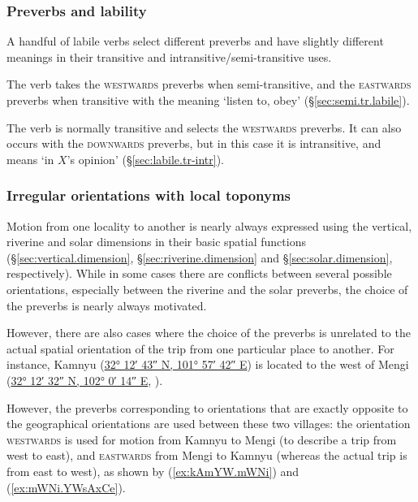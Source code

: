 \subsubsection{Preverbs and lability} \label{sec:orientation.lability}
A handful of labile verbs select different preverbs and have slightly different meanings in their transitive and intransitive/semi-transitive uses.

The verb  takes the \textsc{westwards} preverbs when semi-transitive, and the \textsc{eastwards} preverbs when transitive with the meaning `listen to, obey' (§\ref{sec:semi.tr.labile}).  

The verb  is normally transitive and selects the \textsc{westwards} preverbs. It can also occurs with the \textsc{downwards} preverbs, but in this case it is intransitive, and means `in $X$'s opinion' (§\ref{sec:labile.tr-intr}). 

\subsubsection{Irregular orientations with local toponyms} \label{sec:local.toponyms.orientation}
Motion from one locality to another is nearly always expressed using the vertical, riverine and solar dimensions in their basic spatial functions (§\ref{sec:vertical.dimension}, §\ref{sec:riverine.dimension} and §\ref{sec:solar.dimension}, respectively). While in some cases there are conflicts between several possible orientations, especially between the riverine and the solar preverbs, the choice of the preverbs is nearly always motivated.

However, there are also cases where the choice of the preverbs is unrelated to the actual spatial orientation of the trip from one particular place to another. For instance, Kamnyu  (\href{https://geohack.toolforge.org/geohack.php?params=32.21181437468092_N_101.96170811415986_E}{32° 12′ 43″ N, 101° 57′ 42″ E}) is located to the west of Mengi  (\href{https://geohack.toolforge.org/geohack.php?params=32.20892642316477_N_102.00383911415355_E}{32° 12′ 32″ N, 102° 0′ 14″ E}, ). 

However, the preverbs corresponding to orientations that are exactly opposite to the geographical orientations are used between these two villages: the orientation \textsc{westwards} is used for motion from Kamnyu to Mengi (to describe a trip from west to east), and \textsc{eastwards} from Mengi to Kamnyu (whereas the actual trip is from east to west), as shown by (\ref{ex:kAmYW.mWNi}) and (\ref{ex:mWNi.YWsAxCe}).

